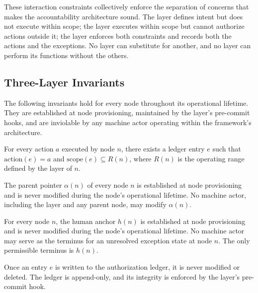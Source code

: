 These interaction constraints collectively enforce the separation of concerns
that makes the \bxthree{} accountability architecture sound.  The \purpose{}
layer defines intent but does not execute within scope; the \bounds{} layer
executes within scope but cannot authorize actions outside it; the \fact{} layer
enforces both constraints and records both the actions and the exceptions.
No layer can substitute for another, and no layer can perform its functions
without the others.

\subsection{Three-Layer Invariants}\label{sec:layer-invariants}

The following invariants hold for every \bxthree{} node throughout its
operational lifetime.  They are established at node provisioning, maintained
by the \fact{} layer's pre-commit hooks, and are inviolable by any machine
actor operating within the framework's architecture.

\begin{invariant}\label{inv:intent}
For every action $a$ executed by node $n$, there exists a ledger entry
$e$ such that $\text{action}(e) = a$ and $\text{scope}(e) \subseteq R(n)$,
where $R(n)$ is the operating range defined by the \purpose{} layer of $n$.
\end{invariant}

\begin{invariant}\label{inv:parent-pointer}
The parent pointer $\alpha(n)$ of every node $n$ is established at node
provisioning and is never modified during the node's operational lifetime.
No machine actor, including the \bounds{} layer and any parent node, may
modify $\alpha(n)$.
\end{invariant}

\begin{invariant}\label{inv:human-anchor}
For every node $n$, the human anchor $h(n)$ is established at node
provisioning and is never modified during the node's operational lifetime.
No machine actor may serve as the terminus for an unresolved exception state
at node $n$.  The only permissible terminus is $h(n)$.
\end{invariant}

\begin{invariant}\label{inv:ledger-immutability}
Once an entry $e$ is written to the authorization ledger, it is never
modified or deleted.  The ledger is append-only, and its integrity is
enforced by the \fact{} layer's pre-commit hook.
\end{invariant}

